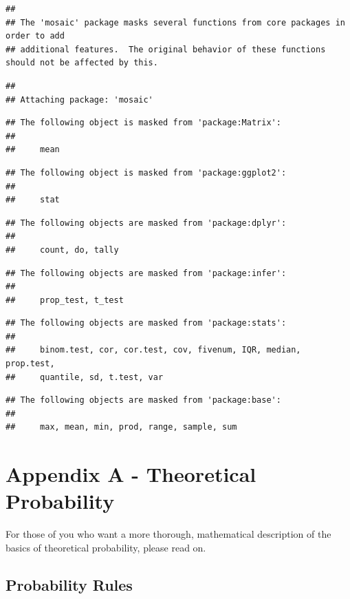 \documentclass[
]{book}
\begin{document}
\begin{verbatim}
## 
## The 'mosaic' package masks several functions from core packages in order to add 
## additional features.  The original behavior of these functions should not be affected by this.
\end{verbatim}

\begin{verbatim}
## 
## Attaching package: 'mosaic'
\end{verbatim}

\begin{verbatim}
## The following object is masked from 'package:Matrix':
## 
##     mean
\end{verbatim}

\begin{verbatim}
## The following object is masked from 'package:ggplot2':
## 
##     stat
\end{verbatim}

\begin{verbatim}
## The following objects are masked from 'package:dplyr':
## 
##     count, do, tally
\end{verbatim}

\begin{verbatim}
## The following objects are masked from 'package:infer':
## 
##     prop_test, t_test
\end{verbatim}

\begin{verbatim}
## The following objects are masked from 'package:stats':
## 
##     binom.test, cor, cor.test, cov, fivenum, IQR, median, prop.test,
##     quantile, sd, t.test, var
\end{verbatim}

\begin{verbatim}
## The following objects are masked from 'package:base':
## 
##     max, mean, min, prod, range, sample, sum
\end{verbatim}

\chapter{Appendix A - Theoretical Probability}\label{appendix-a---theoretical-probability}

For those of you who want a more thorough, mathematical description of the basics of theoretical probability, please read on.

\section{Probability Rules}\label{probability-rules}
\end{document}
